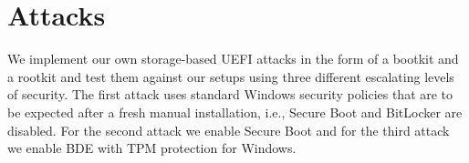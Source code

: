 
\chapter{Attacks}
\label{sec:attacks}

We implement our own storage-based \ac{UEFI} attacks in the form of a bootkit and a rootkit and test them against our setups using three different escalating levels of security.
The first attack uses standard Windows security policies that are to be expected after a fresh manual installation, i.e., Secure Boot and BitLocker are disabled.
For the second attack we enable Secure Boot and for the third attack we enable \ac{BDE} with \ac{TPM} protection for Windows.



